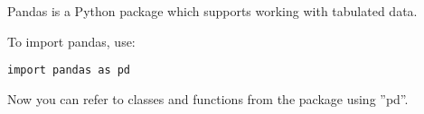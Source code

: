 Pandas is a Python package which supports working with tabulated data.

To import pandas, use:
\begin{lstlisting}
import pandas as pd
\end{lstlisting}

Now you can refer to classes and functions from the package using ”pd”.